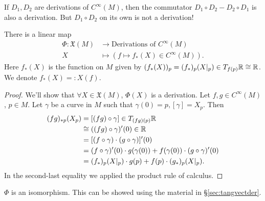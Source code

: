 \begin{remark}
    If $D_1, D_2$ are derivations of $C^{\infty}(M)$, then  the commutator 
 $D_1\circ D_2 - D_2\circ D_1$ 
    is also a derivation. But
    $D_1\circ D_2$ on its own is not a derivation!
\end{remark}
\begin{prop}
    There is a linear map 
    \begin{align*}
        \Phi: \mathfrak{X}(M) &\longrightarrow \text{Derivations of $C^{\infty}(M)$} \\
        X &\longmapsto (f \mapsto f_*(X) \in C^{\infty}(M))
    .\end{align*}
 Here   $f_*(X)$ is the function on $M$ given by $(f_*(X))_{p} = (f_*)_p(X|_p) \in T_{f(p)}\mathbb{R} \cong \mathbb{R}$.
We denote $f_*(X) =: X(f)$.
\end{prop}
\begin{proof}
    We'll show that $\forall X \in \mathfrak{X}(M)$, $\Phi(X)$ is a derivation.
    Let $f, g \in C^{\infty}(M)$, $p \in M$. Let $\gamma$ be a curve in $M$ such that $\gamma(0) = p, [\gamma] = X_p$.
    Then 
     \begin{align*}
         (fg)_{* p} (X_p) &= [ (fg)  \circ  \gamma] \in T_{(fg)(p)} \mathbb{R}\\
                          &\cong ((fg)  \circ \gamma)'(0) \in \mathbb{R}\\
                          &= [(f  \circ \gamma) \cdot (g  \circ  \gamma)]'(0)\\
                          &= (f  \circ \gamma)'(0)  \cdot g(\gamma(0)) + f(\gamma(0))  \cdot(g  \circ  \gamma)'(0)\\
 &= (f_*)_p(X|_p) \cdot g(p)+f(p) \cdot (g_*)_p(X|_p).\end{align*}
In the second-last equality we applied the product rule of calculus.
\end{proof}
\begin{remark}
    $\Phi$ is an isomorphism. This can be showed using the material in \S\ref{sec:tangvectder}.
\end{remark}

